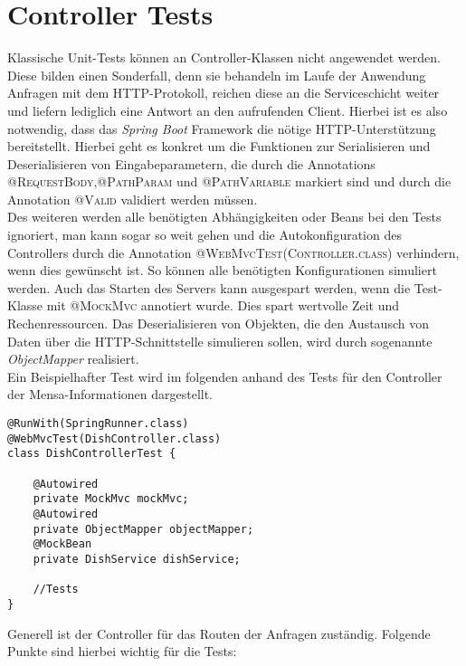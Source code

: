 \section{Controller Tests}

Klassische Unit-Tests können an Controller-Klassen nicht angewendet werden. Diese bilden einen Sonderfall, denn sie behandeln im Laufe der Anwendung Anfragen mit dem \ac{HTTP}-Protokoll, reichen diese an die Serviceschicht weiter und liefern lediglich eine Antwort an den aufrufenden Client. Hierbei ist es also notwendig, dass das \textit{Spring Boot} Framework die nötige \ac{HTTP}-Unterstützung bereitstellt. Hierbei geht es konkret um die Funktionen zur Serialisieren und Deserialisieren von Eingabeparametern, die durch die Annotations \textsc{@RequestBody},\textsc{@PathParam} und \textsc{@PathVariable} markiert sind und durch die Annotation \textsc{@Valid} validiert werden müssen\autocite[][]{controller_test}.\\
\linebreak
Des weiteren werden alle benötigten Abhängigkeiten oder Beans bei den Tests ignoriert, man kann sogar so weit gehen und die Autokonfiguration des Controllers durch die Annotation \textsc{@WebMvcTest(Controller.class)} verhindern, wenn dies gewünscht ist. So können alle benötigten Konfigurationen simuliert werden. Auch das Starten des Servers kann ausgespart werden, wenn die Test-Klasse mit \textsc{@MockMvc} annotiert wurde. Dies spart wertvolle Zeit und Rechenressourcen. Das Deserialisieren von Objekten, die den Austausch von Daten über die \ac{HTTP}-Schnittstelle simulieren sollen, wird durch sogenannte \textit{ObjectMapper} realisiert.\\
\linebreak
\newpage
Ein Beispielhafter Test wird im folgenden anhand des Tests für den Controller der Mensa-Informationen dargestellt.

\begin{lstlisting}[caption={Basis Initialisierung für Controller Tests}, commentstyle=\color{green},]
@RunWith(SpringRunner.class)
@WebMvcTest(DishController.class)
class DishControllerTest {

    @Autowired
    private MockMvc mockMvc;
    @Autowired
    private ObjectMapper objectMapper;
    @MockBean
    private DishService dishService;

    //Tests
}
\end{lstlisting}

Generell ist der Controller für das Routen der Anfragen zuständig. Folgende Punkte sind hierbei wichtig für die Tests\autocite[][]{controller_test}:


